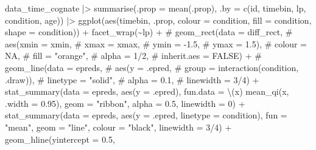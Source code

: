 \documentclass[
  letterpaper,
  DIV=11,
  numbers=noendperiod]{scrartcl}
\newenvironment{Shaded}{\begin{snugshade}}{\end{snugshade}}
\newcommand{\AttributeTok}[1]{\textcolor[rgb]{0.40,0.45,0.13}{#1}}
\newcommand{\CommentTok}[1]{\textcolor[rgb]{0.37,0.37,0.37}{#1}}
\newcommand{\DecValTok}[1]{\textcolor[rgb]{0.68,0.00,0.00}{#1}}
\newcommand{\FloatTok}[1]{\textcolor[rgb]{0.68,0.00,0.00}{#1}}
\newcommand{\FunctionTok}[1]{\textcolor[rgb]{0.28,0.35,0.67}{#1}}
\newcommand{\NormalTok}[1]{\textcolor[rgb]{0.00,0.23,0.31}{#1}}
\newcommand{\SpecialCharTok}[1]{\textcolor[rgb]{0.37,0.37,0.37}{#1}}
\newcommand{\StringTok}[1]{\textcolor[rgb]{0.13,0.47,0.30}{#1}}
\begin{document}
\begin{Shaded}
\begin{Highlighting}[]
\NormalTok{data\_time\_cognate }\SpecialCharTok{|\textgreater{}} 
    \FunctionTok{summarise}\NormalTok{(}\AttributeTok{.prop =} \FunctionTok{mean}\NormalTok{(.prop),}
              \AttributeTok{.by =} \FunctionTok{c}\NormalTok{(id, timebin, lp, condition, age)) }\SpecialCharTok{|\textgreater{}} 
    \FunctionTok{ggplot}\NormalTok{(}\FunctionTok{aes}\NormalTok{(timebin, .prop, }
               \AttributeTok{colour =}\NormalTok{ condition,}
               \AttributeTok{fill =}\NormalTok{ condition,}
               \AttributeTok{shape =}\NormalTok{ condition)) }\SpecialCharTok{+}
    \FunctionTok{facet\_wrap}\NormalTok{(}\SpecialCharTok{\textasciitilde{}}\NormalTok{lp) }\SpecialCharTok{+}
    \CommentTok{\# geom\_rect(data = diff\_rect,}
    \CommentTok{\#         aes(xmin = xmin,}
    \CommentTok{\#           xmax = xmax,}
    \CommentTok{\#           ymin = {-}1.5,}
    \CommentTok{\#           ymax = 1.5),}
    \CommentTok{\#         colour = NA,}
    \CommentTok{\#         fill = "orange",}
    \CommentTok{\#         alpha = 1/2,}
    \CommentTok{\#         inherit.aes = FALSE) +}
    \CommentTok{\# geom\_line(data = epreds,}
    \CommentTok{\#         aes(y = .epred,}
\CommentTok{\#           group = interaction(condition, .draw)),}
\CommentTok{\#         linetype = "solid",}
\CommentTok{\#         alpha = 0.1,}
\CommentTok{\#         linewidth = 3/4) +}
\FunctionTok{stat\_summary}\NormalTok{(}\AttributeTok{data =}\NormalTok{ epreds,}
             \FunctionTok{aes}\NormalTok{(}\AttributeTok{y =}\NormalTok{ .epred),}
             \AttributeTok{fun.data =}\NormalTok{ \textbackslash{}(x) }\FunctionTok{mean\_qi}\NormalTok{(x, }\AttributeTok{.width =} \FloatTok{0.95}\NormalTok{),}
             \AttributeTok{geom =} \StringTok{"ribbon"}\NormalTok{,}
             \AttributeTok{alpha =} \FloatTok{0.5}\NormalTok{,}
             \AttributeTok{linewidth =} \DecValTok{0}\NormalTok{) }\SpecialCharTok{+}
    \FunctionTok{stat\_summary}\NormalTok{(}\AttributeTok{data =}\NormalTok{ epreds,}
                 \FunctionTok{aes}\NormalTok{(}\AttributeTok{y =}\NormalTok{ .epred,}
                    \AttributeTok{linetype =}\NormalTok{ condition),}
                 \AttributeTok{fun =} \StringTok{"mean"}\NormalTok{,}
                 \AttributeTok{geom =} \StringTok{"line"}\NormalTok{,}
                 \AttributeTok{colour =} \StringTok{"black"}\NormalTok{,}
                 \AttributeTok{linewidth =} \DecValTok{3}\SpecialCharTok{/}\DecValTok{4}\NormalTok{) }\SpecialCharTok{+}
    \FunctionTok{geom\_hline}\NormalTok{(}\AttributeTok{yintercept =} \FloatTok{0.5}\NormalTok{, }

\end{Highlighting}
\end{Shaded}
\end{document}
